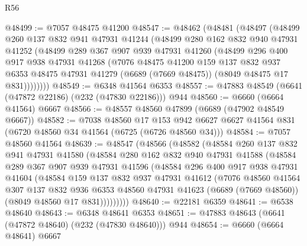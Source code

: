 \begin{lexlean}{R56}
\begin{coremodule}
@48499 := @7057 @48475 @41200
@48547 := @48462
    (@48481
      (@48497
        (@48499
          @260
          @137
          @832
          @941
          @47931
          @41244
          (@48499
            @280
            @162
            @832
            @940
            @47931
            @41252
            (@48499
              @289
              @367
              @907
              @939
              @47931
              @41260
              (@48499
                @296
                @400
                @917
                @938
                @47931
                @41268
                (@7076
                  @48475
                  @41200
                  @159
                  @137
                  @832
                  @937
                  @6353
                  @48475
                  @47931
                  @41279
                  (@6689 (@7669 @48475))
                  (@8049 @48475 @17 @831))))))))
@48549 := @6348 @41564 @6353
@48557 := @47883 @48549 (@6641 (@47872 @22186) (@232 (@47830 @22186))) @944
@48560 := @6660 (@6664 @41564) @6667
@48566 := @48557 @48560 @47899 (@6689 (@47902 @48549 @6667))
@48582 := @7038
    @48560
    @17
    @153
    @942
    @6627
    @6627
    @41564
    @831
    (@6720 @48560 @34 @41564 (@6725 (@6726 @48560 @34)))
@48584 := @7057 @48560 @41564
@48639 := @48547
    (@48566
      (@48582
        (@48584
          @260
          @137
          @832
          @941
          @47931
          @41580
          (@48584
            @280
            @162
            @832
            @940
            @47931
            @41588
            (@48584
              @289
              @367
              @907
              @939
              @47931
              @41596
              (@48584
                @296
                @400
                @917
                @938
                @47931
                @41604
                (@48584
                  @159
                  @137
                  @832
                  @937
                  @47931
                  @41612
                  (@7076
                    @48560
                    @41564
                    @307
                    @137
                    @832
                    @936
                    @6353
                    @48560
                    @47931
                    @41623
                    (@6689 (@7669 @48560))
                    (@8049 @48560 @17 @831)))))))))
@48640 := @22181 @6359
@48641 := @6538 @48640
@48643 := @6348 @48641 @6353
@48651 := @47883 @48643 (@6641 (@47872 @48640) (@232 (@47830 @48640))) @944
@48654 := @6660 (@6664 @48641) @6667

\end{coremodule}
\end{lexlean}
